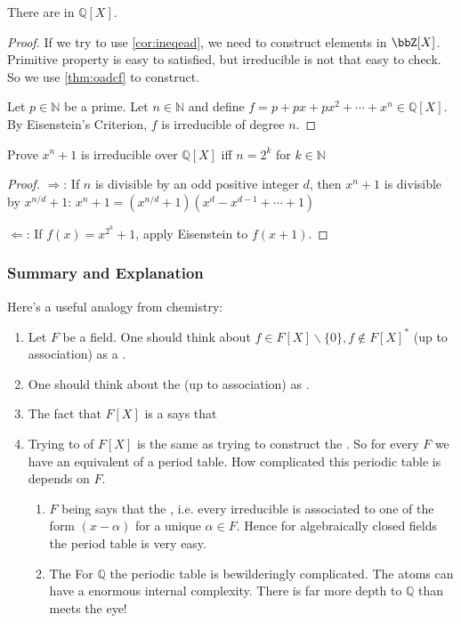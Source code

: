 \documentclass{article}
\begin{document}
\begin{cora}
There are  in $\mathbb{Q}[X]$.
\end{cora}
\begin{proof}
If we try to use  \cref{cor:ineqead}, we need to construct  elements in $\bbZ[X]$. Primitive property is easy to satisfied, but irreducible is not that easy to check. So we use \cref{thm:oadcf} to construct.

Let $p \in \mathbb{N}$ be a prime. Let $n \in \mathbb{N}$ and define $f=p+p x+p x^{2}+\cdots+x^{n} \in \mathbb{Q}[X]$. By Eisenstein's Criterion, $f$ is irreducible of degree $n$.
\end{proof}
\begin{cora}
Prove $x^{n}+1$ is irreducible over $\mathbb{Q}[X]$ iff $n=2^{k}$ for $k \in \mathbb{N}$
\end{cora}
\begin{proof}
$\Rightarrow$: If $n$ is divisible by an odd positive integer $d$, then $x^{n}+1$ is divisible by $x^{n / d}+1$: $x^{n}+1=(x^{n / d}+1)(x^{d}-x^{d-1}+\cdots+1)$

$\Leftarrow$:  If $f(x)=x^{2^{k}}+1$, apply Eisenstein to $f(x+1)$.
\end{proof}

\subsubsection{Summary and Explanation}\label{sec:uakdbfa}
  Here's a useful analogy from chemistry:
  \begin{enumerate}
      \item Let $F$ be a field. One should think about $f \in F[X] \backslash\{0\}, f \notin F[X]^{*}$ (up to association) as a .
      \item One should think about the  (up to association) as .
      \item The fact that $F[X]$ is a  says that 
      \item Trying to  of $F[X]$ is the same as trying to construct the . So for every $F$ we have an equivalent of a period table. How complicated this periodic table is depends on $F$.
      \begin{enumerate}
          \item  $F$ being  says that the , i.e. every irreducible is associated to one of the form $(x-\alpha)$ for a unique $\alpha \in F$. Hence for algebraically closed fields the period table is very easy.
          \item  The  For $\mathbb{Q}$ the periodic table is bewilderingly complicated. The atoms can have a enormous internal complexity. There is far more depth to $\mathbb{Q}$ than meets the eye!
      \end{enumerate}
  \end{enumerate}     
\end{document}
